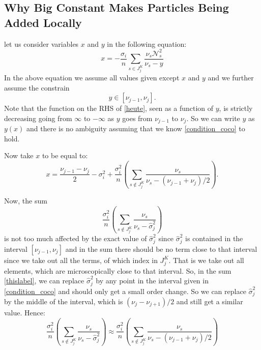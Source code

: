 \documentclass[12pt]{amsart}
\theoremstyle{definition}
\numberwithin{equation}{section}
\numberwithin{equation}{section}
\theoremstyle{remark}
\numberwithin{equation}{section}
\begin{document}
\subsection{Why Big Constant Makes Particles Being Added Locally}
\label{addenda}
let us consider variables $x$ and $y$ in the following equation:
\begin{equation}
\label{heute}
x=-
\frac{\sigma_i}{n}\sum_{s\in J^K_j} \frac{\nu_s\mathcal{N}^2_{s}}{\nu_s-y}
\end{equation}
In the above equation we assume all values given except $x$ and $y$
and we further assume the constrain
\begin{equation}
\label{condition_coco}
y\in [\nu_{j-1},\nu_{j}].
\end{equation}
Note that the function on the RHS of \ref{heute}, seen as a function of $y$, is strictly decreasing going from $\infty$ to $-\infty$ as $y$ goes from $\nu_{j-1}$ to $\nu_j$.
So we can write $y$ as $y(x)$ and there is no ambiguity assuming that we know \ref{condition_coco} to hold.

Now take $x$ to be equal to:
\begin{equation}
\label{heute2}
x= \frac{\nu_{j-1}-\nu_j}{2}-\sigma^2_i +\frac{\sigma^2_i}{n}
\left(\sum_{s\notin J^K_j} \frac{\nu_s}{\nu_s- (\nu_{j-1}+\nu_{j})/2}\right).
\end{equation}

Now, the sum
\begin{equation}
\label{thislabel}
\frac{\sigma^2_i}{n}
\left(\sum_{s\notin J^K_j} \frac{\nu_s}{\nu_s- \hat{\sigma}^2_j}\right)
\end{equation}
is not too much affected by the exact value of $\hat{\sigma}^2_j$ since
$\hat{\sigma}^2_j$ is contained in the interval $[\nu_{j-1},\nu_j]$ and in the sum there  should be no term close to that interval since we take out all the terms, of which index in $J^K_j$. That is we take out all elements, which are microscopically close to that interval. So, in the sum \ref{thislabel}, we can replace $\hat{\sigma}^2_j$
by any point in the interval given in \ref{condition_coco} and should only get a small order change. So we can replace $\hat{\sigma}^2_j$ by the middle of the interval, which is
$(\nu_j-\nu_{j+1})/2$ and still get a similar value. Hence:
\begin{equation}
\label{thislabel2}
\frac{\sigma^2_i}{n}
\left(\sum_{s\notin J^K_j} \frac{\nu_s}{\nu_s- \hat{\sigma}^2_j}\right)
\approx\frac{\sigma^2_i}{n}
\left(\sum_{s\notin J^K_j} \frac{\nu_s}{\nu_s- (\nu_{j-1}+\nu_{j})/2}\right)
\end{equation}
\end{document}
